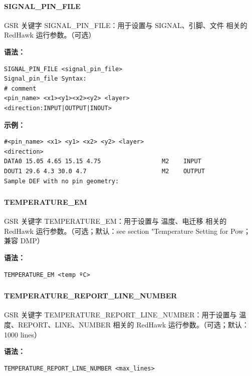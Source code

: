 \paragraph*{SIGNAL_PIN_FILE}

GSR 关键字 SIGNAL_PIN_FILE：用于设置与 SIGNAL、引脚、文件 相关的 RedHawk 运行参数。（可选）

\textbf{语法：}
\begin{lstlisting}
SIGNAL_PIN_FILE <signal_pin_file>
Signal_pin_file Syntax:
# comment
<pin_name> <x1><y1><x2><y2> <layer>
<direction:INPUT|OUTPUT|INOUT>
\end{lstlisting}

\textbf{示例：}
\begin{lstlisting}
#<pin_name> <x1> <y1> <x2> <y2> <layer>
<direction>
DATA0 15.05 4.65 15.15 4.75                 M2    INPUT
DOUT1 29.6 4.3 30.0 4.7                     M2    OUTPUT
Sample DEF with no pin geometry:
\end{lstlisting}

\subsubsection{}
\paragraph*{TEMPERATURE_EM}

GSR 关键字 TEMPERATURE_EM：用于设置与 温度、电迁移 相关的 RedHawk 运行参数。（可选；默认：see section "Temperature Setting for Pow；兼容 DMP）

\textbf{语法：}
\begin{lstlisting}
TEMPERATURE_EM <temp ºC>
\end{lstlisting}

\subsubsection{}
\paragraph*{TEMPERATURE_REPORT_LINE_NUMBER}

GSR 关键字 TEMPERATURE_REPORT_LINE_NUMBER：用于设置与 温度、REPORT、LINE、NUMBER 相关的 RedHawk 运行参数。（可选；默认：1000 lines）

\textbf{语法：}
\begin{lstlisting}
TEMPERATURE_REPORT_LINE_NUMBER <max_lines>
\end{lstlisting}


